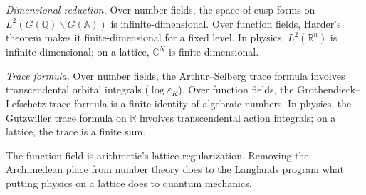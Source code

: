 \documentclass[11pt]{article}
\theoremstyle{definition}
\theoremstyle{remark}
\newcommand{\Q}{\mathbb{Q}}
\newcommand{\R}{\mathbb{R}}
\newcommand{\C}{\mathbb{C}}
\newcommand{\A}{\mathbb{A}}
\begin{document}
\emph{Dimensional reduction.} Over number fields, the space of cusp forms on $L^2(G(\Q) \backslash G(\A))$ is infinite-dimensional. Over function fields, Harder's theorem makes it finite-dimensional for a fixed level. In physics, $L^2(\R^n)$ is infinite-dimensional; on a lattice, $\C^N$ is finite-dimensional.

\emph{Trace formula.} Over number fields, the Arthur--Selberg trace formula involves transcendental orbital integrals ($\log \varepsilon_K$). Over function fields, the Grothendieck--Lefschetz trace formula is a finite identity of algebraic numbers. In physics, the Gutzwiller trace formula on $\R$ involves transcendental action integrals; on a lattice, the trace is a finite sum.

The function field is arithmetic's lattice regularization. Removing the Archimedean place from number theory does to the Langlands program what putting physics on a lattice does to quantum mechanics.
\end{document}
